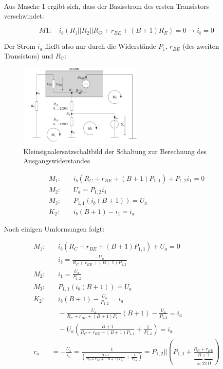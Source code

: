 Aus Masche 1 ergibt sich, dass der Basisstrom des ersten Transistors verschwindet:

\begin{equation*}
    M1: \quad i_b \left( R_1 || R_2 || R_G + r_{BE} + (B + 1) R_E\right) = 0 \rightarrow i_b = 0
\end{equation*}

Der Strom $i_a$ fließt also nur durch die Widerstände $P_1$, $r_{BE}$ (des zweiten Transistors) und $R_C$:

\begin{figure}[H]
    \centering
    \includegraphics[width = 0.55\textwidth]{tex/1_Microphone/pictures/KSESB_ra_detail.pdf}
    \caption{Kleinsignalersatzschaltbild der Schaltung zur Berechnung des Ausgangswiderstandes}
    \label{fig:my_label}
\end{figure}


\begin{align*}
    M_1:& \quad i_b(R_C + r_{BE} + (B+1) P_{1,1}) + P_{1,2} i_1= 0 \\
    M_2:& \quad U_a = P_{1,2} i_1 \\
    M_3:& \quad P_{1,1} (i_b (B+1)) = U_a\\
    K_2:& \quad i_b (B+1) - i_1 = i_a
\end{align*}

Nach einigen Umformungen folgt:

\begin{align*}
    M_1:& \quad i_b(R_C + r_{BE} + (B+1) P_{1,1}) + U_a= 0 \\
    & \quad i_b = \frac{-U_a}{R_C + r_{BE} + (B+1) P_{1,1}}\\
    M_2:& \quad i_1 = \frac{U_a }{ P_{1,2}} \\
    M_3:& \quad P_{1,1} (i_b (B+1)) = U_a\\
    K_2:& \quad i_b (B+1) - \frac{U_a }{ P_{1,2}} = i_a \\
        & \quad - \frac{U_a}{R_C + r_{BE} + (B+1) P_{1,1}}(B+1) - \frac{U_a }{ P_{1,2}} = i_a \\
        & \quad - U_a \left( \frac{B+1}{R_C + r_{BE} + (B+1) P_{1,1}} + \frac{1}{P_{1,2}} \right) = i_a \\
        r_a &= -\frac{U_a}{i_a} = \frac{1}{\left( \frac{B+1}{R_C + r_{BE} + (B+1) P_{1,1}} + \frac{1}{P_{1,2}} \right)} = P_{1,2} || \left( P_{1,1} + \underbrace{\frac{R_C + r_{BE}}{B+1}}_{\approx \SI{22}{\ohm}}\right)
\end{align*}


